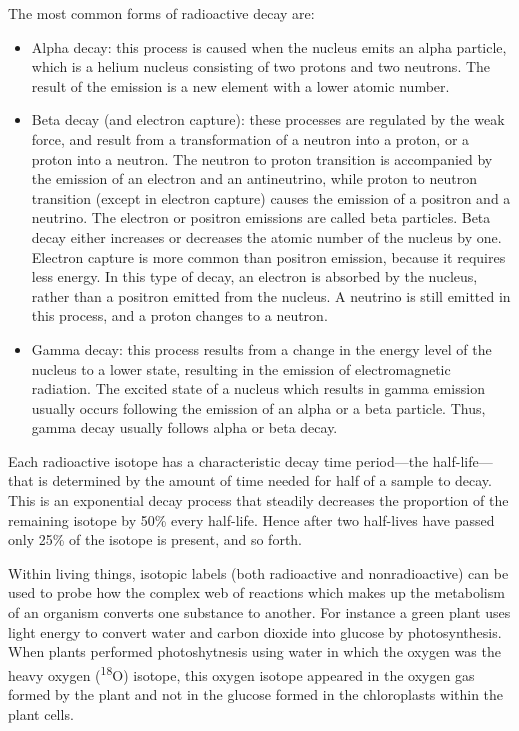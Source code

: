 \documentclass[
]{book}
\providecommand{\tightlist}{%
  \setlength{\itemsep}{0pt}\setlength{\parskip}{0pt}}
\begin{document}
The most common forms of radioactive decay are:

\begin{itemize}
\tightlist
\item
  Alpha decay: this process is caused when the nucleus emits an alpha particle, which is a helium nucleus consisting of two protons and two neutrons. The result of the emission is a new element with a lower atomic number.
\item
  Beta decay (and electron capture): these processes are regulated by the weak force, and result from a transformation of a neutron into a proton, or a proton into a neutron. The neutron to proton transition is accompanied by the emission of an electron and an antineutrino, while proton to neutron transition (except in electron capture) causes the emission of a positron and a neutrino. The electron or positron emissions are called beta particles. Beta decay either increases or decreases the atomic number of the nucleus by one. Electron capture is more common than positron emission, because it requires less energy. In this type of decay, an electron is absorbed by the nucleus, rather than a positron emitted from the nucleus. A neutrino is still emitted in this process, and a proton changes to a neutron.
\item
  Gamma decay: this process results from a change in the energy level of the nucleus to a lower state, resulting in the emission of electromagnetic radiation. The excited state of a nucleus which results in gamma emission usually occurs following the emission of an alpha or a beta particle. Thus, gamma decay usually follows alpha or beta decay.
\end{itemize}

Each radioactive isotope has a characteristic decay time period---the half-life---that is determined by the amount of time needed for half of a sample to decay. This is an exponential decay process that steadily decreases the proportion of the remaining isotope by 50\% every half-life. Hence after two half-lives have passed only 25\% of the isotope is present, and so forth.

Within living things, isotopic labels (both radioactive and nonradioactive) can be used to probe how the complex web of reactions which makes up the metabolism of an organism converts one substance to another. For instance a green plant uses light energy to convert water and carbon dioxide into glucose by photosynthesis. When plants performed photoshytnesis using water in which the oxygen was the heavy oxygen (\textsuperscript{18}O) isotope, this oxygen isotope appeared in the oxygen gas formed by the plant and not in the glucose formed in the chloroplasts within the plant cells.
\end{document}
